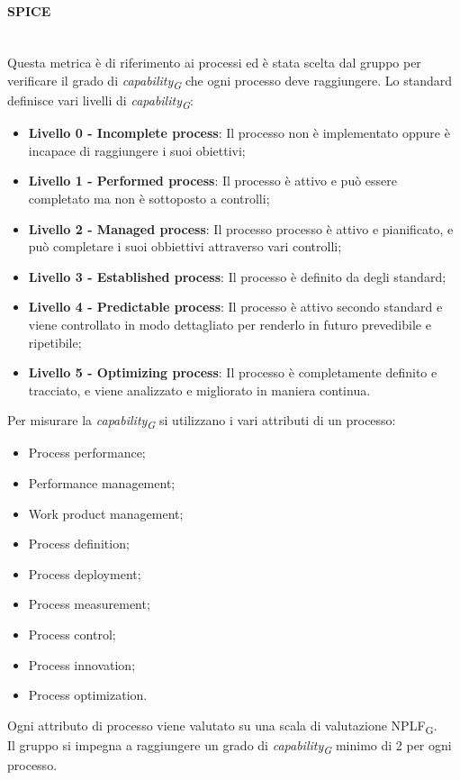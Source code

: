 \paragraph{SPICE}\mbox{}\\
Questa metrica è di riferimento ai processi ed è stata scelta dal gruppo per verificare il grado di \textit{capability\textsubscript{G}} che ogni processo deve raggiungere. Lo standard definisce vari livelli di \textit{capability\textsubscript{G}}:
\begin{itemize}
	\item \textbf{Livello 0 - Incomplete process}: Il processo non è implementato oppure è incapace di raggiungere i suoi obiettivi;
	\item \textbf{Livello 1 - Performed process}: Il processo è attivo e può essere completato ma non è sottoposto a controlli;
	\item \textbf{Livello 2 - Managed process}: Il processo processo è attivo e pianificato, e può completare i suoi obbiettivi attraverso vari controlli;
	\item \textbf{Livello 3 - Established process}: Il processo è definito da degli standard;
	\item \textbf{Livello 4 - Predictable process}: Il processo è attivo secondo standard e viene controllato in modo dettagliato per renderlo in futuro prevedibile e ripetibile;
	\item \textbf{Livello 5 - Optimizing process}: Il processo è completamente definito e tracciato, e viene analizzato e migliorato in maniera continua.
\end{itemize}
Per misurare la \textit{capability\textsubscript{G}} si utilizzano i vari attributi di un processo:
\begin{itemize}
	\item Process performance;
	\item Performance management;
	\item Work product management;
	\item Process definition;
	\item Process deployment;
	\item Process measurement;
	\item Process control;
	\item Process innovation;
	\item Process optimization.
\end{itemize}
Ogni attributo di processo viene valutato su una scala di valutazione NPLF\textsubscript{G}.\\ Il gruppo si impegna a raggiungere un grado di \textit{capability\textsubscript{G}} minimo di 2 per ogni processo.
